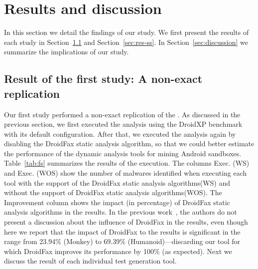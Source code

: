 \section{Results and discussion}

In this section we detail the findings of our study. We first present the results of each study
in Section~\ref{sec:res-fs} and Section~\ref{sec:res-ss}. In Section~\ref{sec:discussion} we summarize the
implications of our study. 

\subsection{Result of the first study: A non-exact replication}\label{sec:res-fs}

Our first study performed a non-exact replication of the \blls.
As discussed in the previous section, we first executed the analysis using the DroidXP benchmark with its default configuration. After that, we executed the analysis again by disabling the DroidFax static analysis algorithm, so that we could better estimate the performance of the dynamic analysis tools for mining Android sandboxes. Table~\ref{tab:fs} summarizes the results of the execution. The columns Exec. (WS) and Exec. (WOS) 
show the number of malwares identified when executing each tool with the
support of the DroidFax static analysis algorithms(WS) and without the support
of DroidFax static analysis algorithms(WOS). The Improvement column shows the impact
(in percentage) of DroidFax static analysis algorithms in the results.
In the previous work~\cite{}, the authors do not present a
discussion about the influence of DroidFax in the results, even
though here we report that the impact of DroidFax to the results is significant in the
range from 23.94\% (Monkey) to 69.39\% (Humanoid)---discarding our
\joke tool for which DroidFax improves its performance by 100\% (as expected).
Next we discuss the result of each individual test generation tool. 

